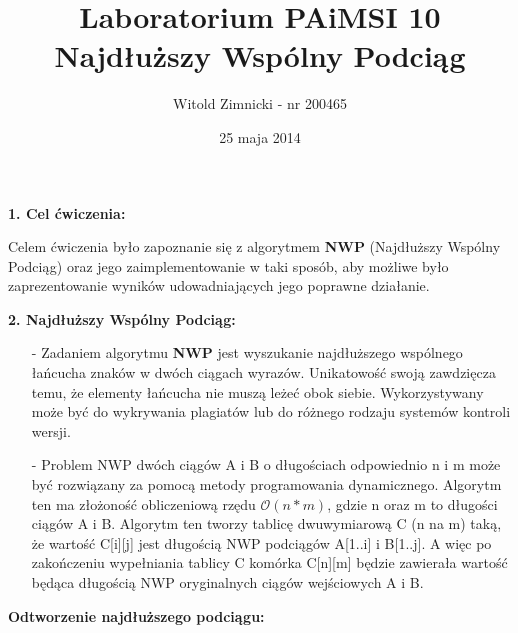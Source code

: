 \documentclass[12pt,a4paper,titlepage]{article}
\title{Laboratorium PAiMSI 10 \\
Najdłuższy Wspólny Podciąg}
\date{25 maja 2014}
\author{Witold Zimnicki - nr 200465}
\begin{document}
	\maketitle
	\pagestyle{empty}
	\pagestyle{headings}
	\begin{large}
	\textbf{1. Cel ćwiczenia:}
	\newline
	\end{large}

	Celem ćwiczenia było zapoznanie się z algorytmem \textbf{NWP} (Najdłuższy Wspólny Podciąg) oraz jego zaimplementowanie w taki sposób, aby możliwe było zaprezentowanie wyników udowadniających jego poprawne działanie.\newline
	\newline

	
	
	\begin{large}
	\textbf{2. Najdłuższy Wspólny Podciąg:}
	\newline
	\end{large}
	
	\begin{itemize}
\item[-] \hspace{8pt}  Zadaniem algorytmu \textbf{NWP} jest wyszukanie najdłuższego wspólnego łańcucha znaków w dwóch ciągach wyrazów. Unikatowość swoją zawdzięcza temu, że elementy łańcucha nie muszą leżeć obok siebie. Wykorzystywany może być do wykrywania plagiatów lub do różnego rodzaju systemów kontroli wersji. \\
\item[-] \hspace{8pt} Problem NWP dwóch ciągów A i B o długościach odpowiednio n i m może być rozwiązany za pomocą metody programowania dynamicznego.
Algorytm ten ma złożoność obliczeniową rzędu $\mathcal{O}(n*m)$, gdzie n oraz m to długości ciągów A i B. Algorytm ten tworzy tablicę dwuwymiarową C (n na m) taką, że wartość C[i][j] jest długością NWP podciągów A[1..i] i B[1..j]. A więc po zakończeniu wypełniania tablicy C komórka C[n][m] będzie zawierała wartość będąca długością NWP oryginalnych ciągów wejściowych A i B.\\\newline
\newline
	\end{itemize}
	
	\begin{large}
	\textbf{Odtworzenie najdłuższego podciągu: }
	\newline
	\end{large}
	
\end{document}
